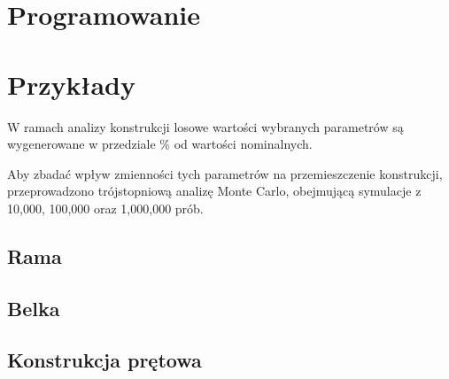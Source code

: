 \section{Programowanie}

\newpage
\section{Przykłady}

W ramach analizy konstrukcji losowe wartości wybranych parametrów są wygenerowane w przedziale \% od wartości nominalnych.

Aby zbadać wpływ zmienności tych parametrów na przemieszczenie konstrukcji, przeprowadzono trójstopniową analizę Monte Carlo,
obejmującą symulacje z 10,000, 100,000 oraz 1,000,000 prób.

\subsection{Rama}

\newpage
\subsection{Belka}

\newpage
\subsection{Konstrukcja prętowa}
